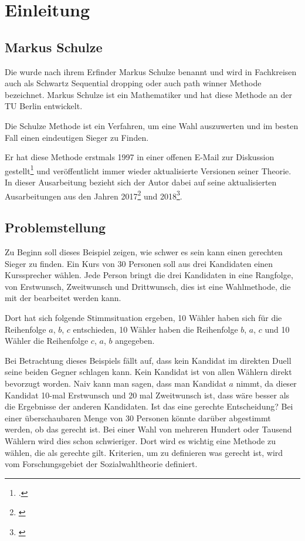 \section{Einleitung}
\label{sec:Einleitung}


\subsection{Markus Schulze} 
\label{sec:markusSchulze}
Die \schulze wurde nach ihrem Erfinder Markus Schulze benannt und wird in Fachkreisen auch als \glqq Schwartz Sequential dropping\grqq{} oder auch \glqq path winner\grqq{} Methode bezeichnet. Markus Schulze ist ein Mathematiker und hat diese Methode an der TU Berlin entwickelt.

Die Schulze Methode ist ein Verfahren, um eine Wahl auszuwerten und im besten Fall einen eindeutigen Sieger zu Finden.

Er hat diese Methode erstmals 1997 in einer offenen E-Mail zur Diskussion gestellt\footnote{\Vgl \citet{Schulze1997}.} und veröffentlicht immer wieder aktualisierte Versionen seiner Theorie. In dieser Ausarbeitung bezieht sich der Autor dabei auf seine aktualisierten Ausarbeitungen aus den Jahren 2017\footnote{\Vgl \citet{Schulze2017}} und 2018\footnote{\Vgl \citet{Schulze2018}}.

\subsection{Problemstellung} 
\label{sec:problemstellungBeispiel}
Zu Beginn soll dieses Beispiel zeigen, wie schwer es sein kann einen gerechten Sieger zu finden. Ein Kurs von 30 Personen soll aus drei Kandidaten einen Kurssprecher wählen. Jede Person bringt die drei Kandidaten in eine Rangfolge, von Erstwunsch, Zweitwunsch und Drittwunsch, dies ist eine Wahlmethode, die mit der \schulze bearbeitet werden kann. 

Dort hat sich folgende Stimmsituation ergeben, 10 Wähler  haben sich für die Reihenfolge $a$, $b$, $c$ entschieden, 10 Wähler haben die Reihenfolge $b$, $a$, $c$ und 10 Wähler die Reihenfolge $c$, $a$, $b$ angegeben.

Bei Betrachtung dieses Beispiels fällt auf, dass kein Kandidat im direkten Duell seine beiden Gegner schlagen kann. Kein Kandidat ist von allen Wählern direkt bevorzugt worden. Naiv kann man sagen, dass man Kandidat $a$ nimmt, da dieser Kandidat 10-mal Erstwunsch und 20 mal Zweitwunsch ist, dass wäre besser als die Ergebnisse der anderen Kandidaten. Ist das eine gerechte Entscheidung? Bei einer überschaubaren Menge von 30 Personen könnte darüber abgestimmt werden, ob das gerecht ist. Bei einer Wahl von mehreren Hundert oder Tausend Wählern wird dies schon schwieriger. Dort wird es wichtig eine Methode zu wählen, die als \glqq gerechte\grqq{} gilt.
Kriterien, um zu definieren was gerecht ist, wird vom Forschungsgebiet der Sozialwahltheorie definiert.

